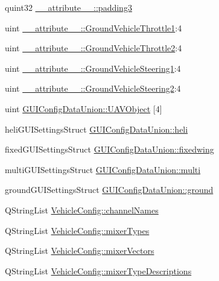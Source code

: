 \begin{DoxyCompactItemize}
\item 
quint32 \hyperlink{group___config_plugin_gae95d6e80e1c87598f33d4be1b0a8c410}{\-\_\-\-\_\-attribute\-\_\-\-\_\-\-::padding3}
\item 
uint \hyperlink{group___config_plugin_ga755435654b7373fe879e991ccdd40757}{\-\_\-\-\_\-attribute\-\_\-\-\_\-\-::\-Ground\-Vehicle\-Throttle1}\-:4
\item 
uint \hyperlink{group___config_plugin_ga6a8ae4214756c689b83b9f42a56c2505}{\-\_\-\-\_\-attribute\-\_\-\-\_\-\-::\-Ground\-Vehicle\-Throttle2}\-:4
\item 
uint \hyperlink{group___config_plugin_gad4fe3d4d30764b30210253be62bb0974}{\-\_\-\-\_\-attribute\-\_\-\-\_\-\-::\-Ground\-Vehicle\-Steering1}\-:4
\item 
uint \hyperlink{group___config_plugin_gab404016de72261d048356e628b9ef0b7}{\-\_\-\-\_\-attribute\-\_\-\-\_\-\-::\-Ground\-Vehicle\-Steering2}\-:4
\item 
uint \hyperlink{group___config_plugin_ga1a1fbf9187086cc92fac84f33f19402f}{\-G\-U\-I\-Config\-Data\-Union\-::\-U\-A\-V\-Object} \mbox{[}4\mbox{]}
\item 
heli\-G\-U\-I\-Settings\-Struct \hyperlink{group___config_plugin_gae9da8787d8f36ea6650045cf28c3b40d}{\-G\-U\-I\-Config\-Data\-Union\-::heli}
\item 
fixed\-G\-U\-I\-Settings\-Struct \hyperlink{group___config_plugin_ga10cc00a6af97a84e5f17358ed3c5eb34}{\-G\-U\-I\-Config\-Data\-Union\-::fixedwing}
\item 
multi\-G\-U\-I\-Settings\-Struct \hyperlink{group___config_plugin_ga2bab1814b15f618e30827215faea4f5e}{\-G\-U\-I\-Config\-Data\-Union\-::multi}
\item 
ground\-G\-U\-I\-Settings\-Struct \hyperlink{group___config_plugin_ga27dfb53cf12c8f8bb3a869bdfa8c11cf}{\-G\-U\-I\-Config\-Data\-Union\-::ground}
\item 
\-Q\-String\-List \hyperlink{group___config_plugin_gaca881ae0a25d7e063b68a36b2f5576bf}{\-Vehicle\-Config\-::channel\-Names}
\item 
\-Q\-String\-List \hyperlink{group___config_plugin_ga494123875db35fe04e5a0512850e8c02}{\-Vehicle\-Config\-::mixer\-Types}
\item 
\-Q\-String\-List \hyperlink{group___config_plugin_ga0f47a1cc91e5a63c70f0802f3533e193}{\-Vehicle\-Config\-::mixer\-Vectors}
\item 
\-Q\-String\-List \hyperlink{group___config_plugin_ga05f4cbfd3c5b0fcc642f17003888459a}{\-Vehicle\-Config\-::mixer\-Type\-Descriptions}
\item 

\end{DoxyCompactItemize}
